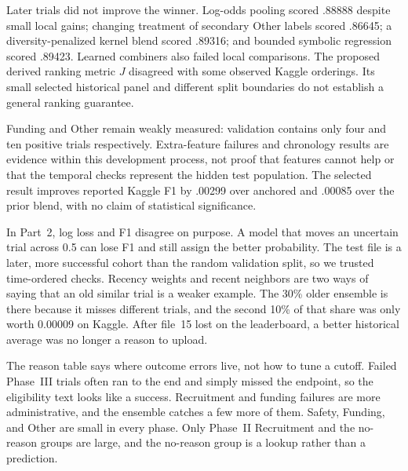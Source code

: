 \documentclass[10pt,twocolumn,letterpaper]{article}
\begin{document}
Later trials did not improve the winner. Log-odds pooling scored .88888 despite
small local gains; changing treatment of secondary Other labels scored .86645;
a diversity-penalized kernel blend scored .89316; and bounded symbolic
regression scored .89423. Learned combiners also failed local comparisons.
The proposed derived ranking metric $J$ disagreed with some observed Kaggle
orderings. Its small selected historical panel and different split boundaries
do not establish a general ranking guarantee.

Funding and Other remain weakly measured: validation contains only four and ten
positive trials respectively. Extra-feature failures and chronology results
are evidence within this development process, not proof that features cannot
help or that the temporal checks represent the hidden test population. The
selected result improves reported Kaggle F1 by .00299 over anchored and .00085
over the prior blend, with no claim of statistical significance.

In Part~2, log loss and F1 disagree on purpose. A model that moves an uncertain
trial across 0.5 can lose F1 and still assign the better probability. The test
file is a later, more successful cohort than the random validation split, so we
trusted time-ordered checks. Recency weights and recent neighbors are two ways
of saying that an old similar trial is a weaker example. The 30\% older
ensemble is there because it misses different trials, and the second 10\% of
that share was only worth 0.00009 on Kaggle. After file~15 lost on the
leaderboard, a better historical average was no longer a reason to upload.

The reason table says where outcome errors live, not how to tune a cutoff.
Failed Phase~III trials often ran to the end and simply missed the endpoint, so
the eligibility text looks like a success. Recruitment and funding failures are
more administrative, and the ensemble catches a few more of them. Safety,
Funding, and Other are small in every phase. Only Phase~II Recruitment and the
no-reason groups are large, and the no-reason group is a lookup rather than a
prediction.

{
    \small
    
    
}
\end{document}

